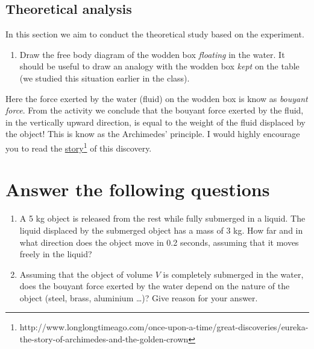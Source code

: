 \documentclass[10pt]{article}
\begin{document}
\subsection{Theoretical analysis}
In this section we aim to conduct the theoretical study based on the experiment.
\begin{enumerate}
\item Draw the free body diagram of the wodden box \emph{floating} in the water.  It should be useful to draw an analogy with the wodden box \emph{kept} on the table (we studied this situation earlier in the class). 
\vspace{250px}
\end{enumerate}
Here the force exerted by the water (fluid) on the wodden box is know as \emph{bouyant force}.  From the activity we conclude that the bouyant force exerted by the fluid, in the vertically upward direction, is equal to the weight of the fluid displaced by the object!  This is know as the Archimedes' principle.  I would highly encourage you to read the \href{http://www.longlongtimeago.com/once-upon-a-time/great-discoveries/eureka-the-story-of-archimedes-and-the-golden-crown/}{story}\footnote{http://www.longlongtimeago.com/once-upon-a-time/great-discoveries/eureka-the-story-of-archimedes-and-the-golden-crown} of this discovery. 

\section{Answer the following questions}
\begin{enumerate}
\item A 5 kg object is released from the rest while fully submerged in a liquid.  The liquid displaced by the submerged object has a mass of 3 kg.  How far and in what direction does the object move in 0.2 seconds, assuming that it moves freely in the liquid?
\vspace{250px}
\item Assuming that the object of volume $V$ is completely submerged in the water, does the bouyant force exerted by the water depend on the nature of the object (steel, brass, aluminium \ldots)?  Give reason for your answer.
\end{enumerate}
\end{document}
